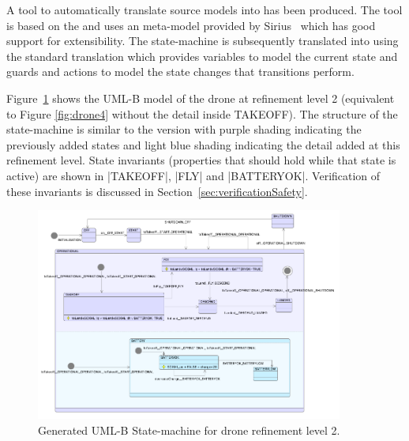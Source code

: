 A tool to automatically translate \SCXML source models into \UMLB has been produced. 
The tool is based on the \EMF and uses an \SCXML meta-model provided by Sirius~\cite{siriuswebsite} which has good support for extensibility. 
The \UMLB state-machine is subsequently translated into \EVENTB using the standard \UMLB translation which provides variables to model the current state and guards and actions to model the state changes that transitions perform.

Figure~\ref{fig:drone2UMLB} shows the UML-B model of the drone at refinement level 2 (equivalent to Figure \ref{fig:drone4} without the detail inside TAKEOFF).
The structure of the state-machine is similar to the \SCXML version with purple shading indicating the previously added states and light blue shading indicating the detail added at this refinement level.
State invariants (properties that should hold while that state is active) are shown in |TAKEOFF|, |FLY| and |BATTERYOK|.
Verification of these invariants is discussed in Section~\ref{sec:verificationSafety}.

\begin{figure}[]
	\centering
	\includegraphics[width=0.90\textwidth, trim=0 40 0 0]{figures/drone2UMLB.png}
	\caption{Generated UML-B State-machine for drone refinement level 2. }
	\label{fig:drone2UMLB}
\end{figure} 

